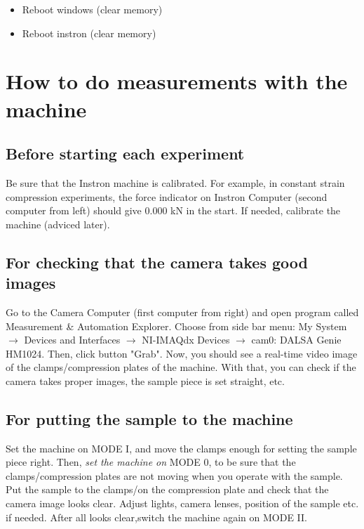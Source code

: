 \documentclass[a4paper]{article}
\begin{document}
\begin{itemize}
  \item Reboot windows (clear memory)
  \item Reboot instron (clear memory)
\end{itemize}

\section{How to do measurements with the machine}

\subsection{Before starting each experiment}

Be sure that the Instron machine is calibrated. For example, in constant
strain compression experiments, the force indicator on Instron Computer
(second computer from left) should give 0.000 kN in the start. If needed,
calibrate the machine (adviced later).

\subsection{For checking that the camera takes good images}

Go to the Camera Computer (first computer from right) and open program
called Measurement \& Automation Explorer. Choose from side bar menu:
My System $\rightarrow$ Devices and Interfaces $\rightarrow$ NI-IMAQdx Devices
$\rightarrow$ cam0: DALSA Genie HM1024. Then, click button "Grab". Now, you
should see a real-time video image of the clamps/compression plates of the
machine. With that, you can check if the camera takes proper images, the
sample piece is set straight, etc.

\subsection{For putting the sample to the machine}

Set the machine on \textsf{MODE I}, and move the clamps enough for setting
the sample piece right. Then, \textit{set the machine on} \textsf{MODE 0},
to be sure that the clamps/compression plates are not moving when you operate
with the sample. Put the sample to the clamps/on the compression plate and
check that the camera image looks clear. Adjust lights, camera lenses, 
position of the sample etc. if needed. After all looks clear,switch the 
machine again on \textsf{MODE II}.
\end{document}
